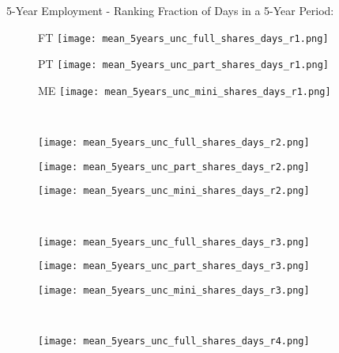 \documentclass[hyperref={bookmarks=false}]{beamer}
\begin{document}
\begin{appendix}
\begin{frame}{5-Year Employment - Ranking}
Fraction of Days in a 5-Year Period:
\begin{figure}[!t]
\begin{minipage}[b]{0.15\textwidth}{FT}
\centering
\texttt{[image: mean\_5years\_unc\_full\_shares\_days\_r1.png]}
\end{minipage}
\begin{minipage}[b]{0.15\textwidth}{PT}
\centering
\texttt{[image: mean\_5years\_unc\_part\_shares\_days\_r1.png]}
\end{minipage}
\begin{minipage}[b]{0.15\textwidth}{ME}
\centering
\texttt{[image: mean\_5years\_unc\_mini\_shares\_days\_r1.png]}
\end{minipage}\\
\begin{minipage}[b]{0.15\textwidth}{}
\centering
\texttt{[image: mean\_5years\_unc\_full\_shares\_days\_r2.png]}
\end{minipage}
\begin{minipage}[b]{0.15\textwidth}{}
\centering
\texttt{[image: mean\_5years\_unc\_part\_shares\_days\_r2.png]}
\end{minipage}
\begin{minipage}[b]{0.15\textwidth}{}
\centering
\texttt{[image: mean\_5years\_unc\_mini\_shares\_days\_r2.png]}
\end{minipage}\\
\begin{minipage}[b]{0.15\textwidth}{}
\centering
\texttt{[image: mean\_5years\_unc\_full\_shares\_days\_r3.png]}
\end{minipage}
\begin{minipage}[b]{0.15\textwidth}{}
\centering
\texttt{[image: mean\_5years\_unc\_part\_shares\_days\_r3.png]}
\end{minipage}
\begin{minipage}[b]{0.15\textwidth}{}
\centering
\texttt{[image: mean\_5years\_unc\_mini\_shares\_days\_r3.png]}
\end{minipage}\\
\begin{minipage}[b]{0.15\textwidth}{}
\centering
\texttt{[image: mean\_5years\_unc\_full\_shares\_days\_r4.png]}
\end{minipage}
\begin{minipage}[b]{0.15\textwidth}{}
\centering

\end{minipage}
\end{figure}
\end{frame}
\end{appendix}
\end{document}
